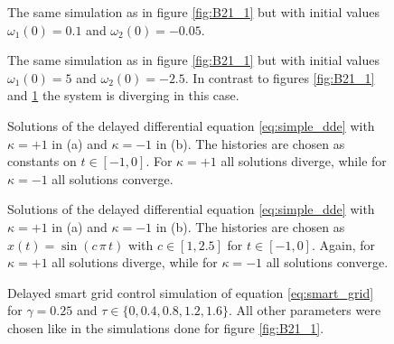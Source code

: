 \documentclass{scrartcl}
\begin{document}
\begin{figure}[h]
    \centering
    \caption{The same simulation as in figure \ref{fig:B21_1} but with
    initial values $\omega_1(0) = 0.1$ and $\omega_2(0) = -0.05$.}
    \label{fig:B21_2}
\end{figure}

\begin{figure}[h]
    \centering
     \caption{The same simulation as in figure
        \ref{fig:B21_1} but with initial values $\omega_1(0) = 5$ and
        $\omega_2(0) = -2.5$. In contrast to figures \ref{fig:B21_1} and
        \ref{fig:B21_2} the system is diverging in this case.}
    \label{fig:B21_3}
\end{figure}

\begin{figure}[h]
    \centering
     \caption{Solutions of the delayed
        differential equation
        \eqref{eq:simple_dde} with $\kappa=+1$ in (a) and $\kappa=-1$ in
        (b). The histories are chosen as constants on $t\in[-1, 0]$.
        For $\kappa=+1$ all solutions diverge, while for $\kappa=-1$ all
        solutions converge.}
    \label{fig:B22_1}
\end{figure}

\begin{figure}[h]
    \centering
     \caption{Solutions of the delayed
        differential equation
        \eqref{eq:simple_dde} with $\kappa=+1$ in (a) and $\kappa=-1$ in
        (b). The histories are chosen as  $x(t) = \sin(c\,\pi\,t)$ with
        $c\in[1, 2.5]$ for $t\in[-1, 0]$. Again, for $\kappa=+1$ all solutions
        diverge, while for $\kappa=-1$ all solutions converge.}
    \label{fig:B22_2}
\end{figure}

\begin{figure}[h]
    \centering
    \caption{Delayed smart grid control simulation of equation
        \eqref{eq:smart_grid} for $\gamma = 0.25$ and $\tau\in \{0, 0.4,
        0.8, 1.2, 1.6\}$. All other parameters were chosen like in the
        simulations done for figure \ref{fig:B21_1}.}
    \label{fig:B23}
\end{figure}
\end{document}
